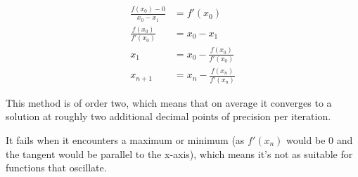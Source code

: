 \documentclass[]{article}
\begin{document}
\begin{align*}
	\frac{f(x_0) - 0}{x_0 - x_1} &= f'(x_0) \\
	\frac{f(x_0)}{f'(x_0)} &= x_0 - x_1 \\
	x_1 &= x_0 - \frac{f(x_0)}{f'(x_0)} \\
	x_{n+1} &= x_n - \frac{f(x_n)}{f'(x_n)}
\end{align*}

This method is of order two, which means that on average it converges to a solution at roughly two additional decimal points of precision per iteration. 

It fails when it encounters a maximum or minimum (as $ f'(x_n) $ would be 0 and the tangent would be parallel to the x-axis), which means it's not as suitable for functions that oscillate. 
\end{document}

